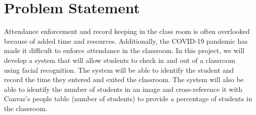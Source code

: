 \section{Problem Statement}
\label{sec:problem}
Attendance enforcement and record keeping in the class room is often overlooked because of added time and resources. Additionally, the COVID-19 pandemic has made it difficult to enforce attendance in the classroom. In this project, we will develop a system that will allow students to check in and out of a classroom using facial recognition. The system will be able to identify the student and record the time they entered and exited the classroom. The system will also be able to identify the number of students in an image and cross-reference it with Canvas's people table (number of students) to provide a percentage of students in the classroom.
